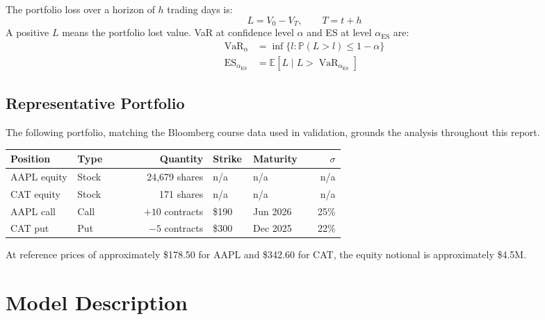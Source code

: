\documentclass[11pt]{article}
\DeclareMathOperator{\VaR}{VaR}
\DeclareMathOperator{\ES}{ES}
\newcommand{\E}{\mathbb{E}}
\newcommand{\Prob}{\mathbb{P}}
\begin{document}
The portfolio loss over a horizon of $h$ trading days is:
\begin{equation}
  L = V_0 - V_T, \qquad T = t + h
  \label{eq:loss}
\end{equation}
A positive $L$ means the portfolio lost value.  VaR at confidence level
$\alpha$ and ES at level $\alpha_{\mathrm{ES}}$ are:
\begin{align}
  \VaR_\alpha &= \inf\bigl\{l : \Prob(L > l) \leq 1 - \alpha\bigr\}
  \label{eq:var_def}\\[4pt]
  \ES_{\alpha_{\mathrm{ES}}} &= \E\!\left[L \;\big|\; L > \VaR_{\alpha_{\mathrm{ES}}}\right]
  \label{eq:es_def}
\end{align}

\subsection{Representative Portfolio}

The following portfolio, matching the Bloomberg course data used in
validation, grounds the analysis throughout this report.

\begin{center}
\begin{tabular}{@{}L{0.20\linewidth}L{0.12\linewidth}r
                  L{0.12\linewidth}L{0.12\linewidth}r@{}}
\toprule
Position & Type & Quantity & Strike & Maturity & $\sigma$ \\
\midrule
AAPL equity  & Stock & 24{,}679 shares  & n/a    & n/a      & n/a  \\
CAT equity   & Stock & 171 shares       & n/a    & n/a      & n/a  \\
AAPL call    & Call  & $+10$ contracts  & \$190  & Jun 2026 & 25\% \\
CAT put      & Put   & $-5$ contracts   & \$300  & Dec 2025 & 22\% \\
\bottomrule
\end{tabular}
\end{center}

At reference prices of approximately \$178.50 for AAPL and \$342.60 for
CAT, the equity notional is approximately \$4.5M.

\section{Model Description}
\label{sec:model-description}
\end{document}
